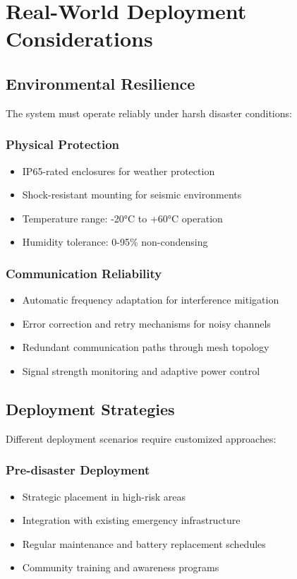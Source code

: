 \documentclass[conference]{IEEEtran}
\begin{document}
\section{Real-World Deployment Considerations}

\subsection{Environmental Resilience}

The system must operate reliably under harsh disaster conditions:

\subsubsection{Physical Protection}
\begin{itemize}
\item IP65-rated enclosures for weather protection
\item Shock-resistant mounting for seismic environments
\item Temperature range: -20°C to +60°C operation
\item Humidity tolerance: 0-95\% non-condensing
\end{itemize}

\subsubsection{Communication Reliability}
\begin{itemize}
\item Automatic frequency adaptation for interference mitigation
\item Error correction and retry mechanisms for noisy channels
\item Redundant communication paths through mesh topology
\item Signal strength monitoring and adaptive power control
\end{itemize}

\subsection{Deployment Strategies}

Different deployment scenarios require customized approaches:

\subsubsection{Pre-disaster Deployment}
\begin{itemize}
\item Strategic placement in high-risk areas
\item Integration with existing emergency infrastructure
\item Regular maintenance and battery replacement schedules
\item Community training and awareness programs
\end{itemize}
\end{document}
